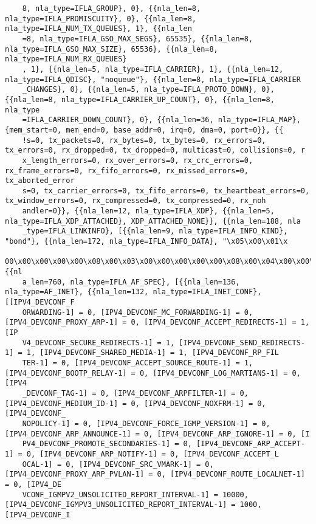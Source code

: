 \documentclass[pdf, unicode, 12pt, a4paper,oneside,fleqn]{article}
\begin{document}
{\begin{verbatim}
    8, nla_type=IFLA_GROUP}, 0}, {{nla_len=8, nla_type=IFLA_PROMISCUITY}, 0}, {{nla_len=8, nla_type=IFLA_NUM_TX_QUEUES}, 1}, {{nla_len
    =8, nla_type=IFLA_GSO_MAX_SEGS}, 65535}, {{nla_len=8, nla_type=IFLA_GSO_MAX_SIZE}, 65536}, {{nla_len=8, nla_type=IFLA_NUM_RX_QUEUES}
    , 1}, {{nla_len=5, nla_type=IFLA_CARRIER}, 1}, {{nla_len=12, nla_type=IFLA_QDISC}, "noqueue"}, {{nla_len=8, nla_type=IFLA_CARRIER
    _CHANGES}, 0}, {{nla_len=5, nla_type=IFLA_PROTO_DOWN}, 0}, {{nla_len=8, nla_type=IFLA_CARRIER_UP_COUNT}, 0}, {{nla_len=8, nla_type
    =IFLA_CARRIER_DOWN_COUNT}, 0}, {{nla_len=36, nla_type=IFLA_MAP}, {mem_start=0, mem_end=0, base_addr=0, irq=0, dma=0, port=0}}, {{
    !s=0, tx_packets=0, rx_bytes=0, tx_bytes=0, rx_errors=0, tx_errors=0, rx_dropped=0, tx_dropped=0, multicast=0, collisions=0, r
    x_length_errors=0, rx_over_errors=0, rx_crc_errors=0, rx_frame_errors=0, rx_fifo_errors=0, rx_missed_errors=0, tx_aborted_error
    s=0, tx_carrier_errors=0, tx_fifo_errors=0, tx_heartbeat_errors=0, tx_window_errors=0, rx_compressed=0, tx_compressed=0, rx_noh
    andler=0}}, {{nla_len=12, nla_type=IFLA_XDP}, {{nla_len=5, nla_type=IFLA_XDP_ATTACHED}, XDP_ATTACHED_NONE}}, {{nla_len=188, nla
    _type=IFLA_LINKINFO}, [{{nla_len=9, nla_type=IFLA_INFO_KIND}, "bond"}, {{nla_len=172, nla_type=IFLA_INFO_DATA}, "\x05\x00\x01\x
    00\x00\x00\x00\x00\x08\x00\x03\x00\x00\x00\x00\x00\x08\x00\x04\x00\x00\x00\x00\x00\x08\x00\x05\x00\x00\x00\x00\x00"...}]}, {{nl
    a_len=760, nla_type=IFLA_AF_SPEC}, [{{nla_len=136, nla_type=AF_INET}, {{nla_len=132, nla_type=IFLA_INET_CONF}, [[IPV4_DEVCONF_F
    ORWARDING-1] = 0, [IPV4_DEVCONF_MC_FORWARDING-1] = 0, [IPV4_DEVCONF_PROXY_ARP-1] = 0, [IPV4_DEVCONF_ACCEPT_REDIRECTS-1] = 1, [IP
    V4_DEVCONF_SECURE_REDIRECTS-1] = 1, [IPV4_DEVCONF_SEND_REDIRECTS-1] = 1, [IPV4_DEVCONF_SHARED_MEDIA-1] = 1, [IPV4_DEVCONF_RP_FIL
    TER-1] = 0, [IPV4_DEVCONF_ACCEPT_SOURCE_ROUTE-1] = 1, [IPV4_DEVCONF_BOOTP_RELAY-1] = 0, [IPV4_DEVCONF_LOG_MARTIANS-1] = 0, [IPV4
    _DEVCONF_TAG-1] = 0, [IPV4_DEVCONF_ARPFILTER-1] = 0, [IPV4_DEVCONF_MEDIUM_ID-1] = 0, [IPV4_DEVCONF_NOXFRM-1] = 0, [IPV4_DEVCONF_
    NOPOLICY-1] = 0, [IPV4_DEVCONF_FORCE_IGMP_VERSION-1] = 0, [IPV4_DEVCONF_ARP_ANNOUNCE-1] = 0, [IPV4_DEVCONF_ARP_IGNORE-1] = 0, [I
    PV4_DEVCONF_PROMOTE_SECONDARIES-1] = 0, [IPV4_DEVCONF_ARP_ACCEPT-1] = 0, [IPV4_DEVCONF_ARP_NOTIFY-1] = 0, [IPV4_DEVCONF_ACCEPT_L
    OCAL-1] = 0, [IPV4_DEVCONF_SRC_VMARK-1] = 0, [IPV4_DEVCONF_PROXY_ARP_PVLAN-1] = 0, [IPV4_DEVCONF_ROUTE_LOCALNET-1] = 0, [IPV4_DE
    VCONF_IGMPV2_UNSOLICITED_REPORT_INTERVAL-1] = 10000, [IPV4_DEVCONF_IGMPV3_UNSOLICITED_REPORT_INTERVAL-1] = 1000, [IPV4_DEVCONF_I

\end{verbatim}}
\end{document}
